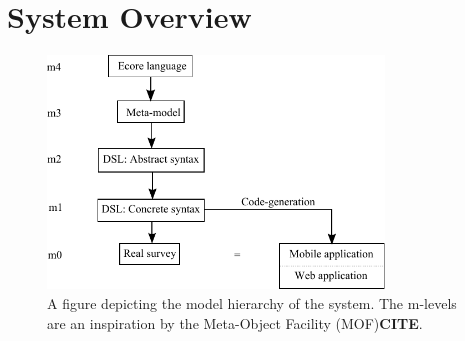 \documentclass[runningheads]{llncs}
\begin{document}
\section{System Overview}
\begin{figure}
\centering
\includegraphics[height=6.2cm]{modelhierarchy}
\caption{A figure depicting the model hierarchy of the system. The m-levels are an inspiration by the Meta-Object Facility (MOF)\textbf{CITE}.}
\label{fig:mhier}
\end{figure}
\end{document}
